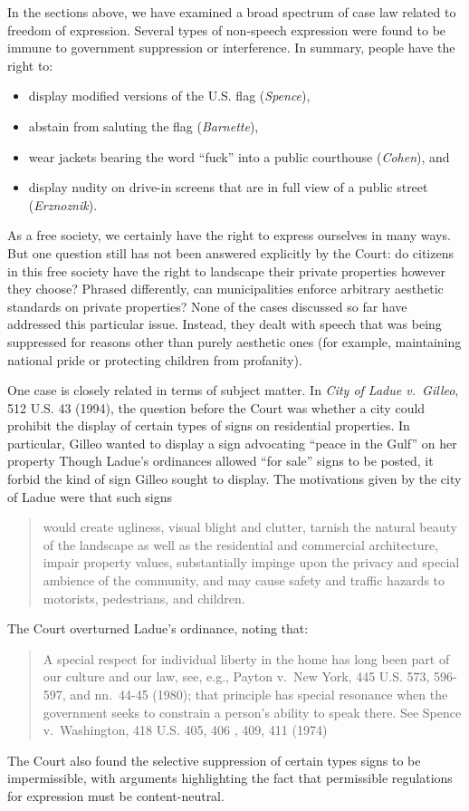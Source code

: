 \documentclass[12pt]{article}
\begin{document}
In the sections above, we have examined a broad spectrum of case law related to freedom of expression. 
Several types of non-speech expression were found to be immune to government suppression or interference.
In summary, people have the right to:
\begin{itemize}
\item display modified versions of the U.S. flag ({\em Spence}),
\item abstain from saluting the flag ({\em Barnette}),
\item wear jackets bearing the word ``fuck'' into a public courthouse ({\em Cohen}), and
\item display nudity on drive-in screens that are in full view of a public street ({\em Erznoznik}).
\end{itemize}
As a free society, we certainly have the right to express ourselves in many ways.
But one question still has not been answered explicitly by the Court:  do citizens in this free society have the right to landscape their private properties however they choose?
Phrased differently, can municipalities enforce arbitrary aesthetic standards on private properties?
None of the cases discussed so far have addressed this particular issue.
Instead, they dealt with speech that was being suppressed for reasons other than purely aesthetic ones (for example, maintaining national pride or protecting children from profanity).

One case is closely related in terms of subject matter. 
In {\em City of Ladue v.\ Gilleo}, 512 U.S. 43 (1994), the question before the Court was whether a city could prohibit the display of certain types of signs on residential properties.
In particular, Gilleo wanted to display a sign advocating ``peace in the Gulf'' on her property
Though Ladue's ordinances allowed ``for sale'' signs to be posted, it forbid the kind of sign Gilleo sought to display.
The motivations given by the city of Ladue were that such signs
\begin{quote} 
would create ugliness, visual blight and clutter, tarnish the natural beauty of the landscape as well as the residential and commercial architecture, impair property values, substantially impinge upon the privacy and special ambience of the community, and may cause safety and traffic hazards to motorists, pedestrians, and children.
\end{quote}
The Court overturned Ladue's ordinance, noting that:
\begin{quote}
A special respect for individual liberty in the home has long been part of our culture and our law, see, e.g., Payton v.\ New York, 445 U.S. 573, 596-597, and nn.\ 44-45 (1980);  that principle has special resonance when the government seeks to constrain a person's ability to speak there.   See Spence v.\ Washington, 418 U.S. 405, 406 , 409, 411 (1974)
\end{quote}
The Court also found the selective suppression of certain types signs to be impermissible, with arguments highlighting the fact that permissible regulations for expression must be content-neutral.
\end{document}
